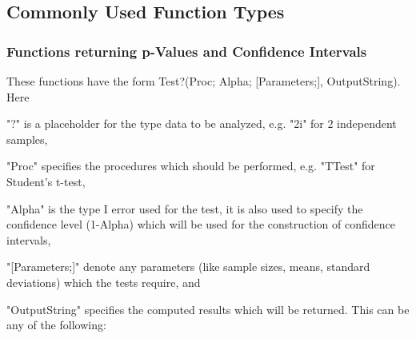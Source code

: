 \newpage
\subsection{Commonly Used Function Types}



\subsubsection{Functions returning p-Values and Confidence Intervals}
\label{Functions returning p-Values and Confidence Intervals}
These functions have the form \textsf{Test?(Proc; Alpha; [Parameters;], OutputString)}.
Here 

"?" is a placeholder for the type data to be analyzed, e.g. "2i" for 2 independent samples, 

"Proc" specifies the procedures which should be performed, e.g. "TTest" for Student's t-test, 

"Alpha" is the type I error used for the test, it is also used to specify the confidence level (1-Alpha) which will be used for the construction of confidence intervals, 


"[Parameters;]" denote any parameters (like sample sizes, means, standard deviations) which the tests require, and 

"OutputString" specifies the computed results which will be returned. This can be any of the following:

